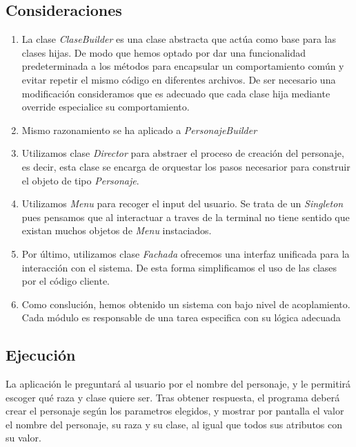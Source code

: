 \documentclass{article}
\begin{document}
\subsection{Consideraciones}
\begin{enumerate}[label=-] %
    \item La clase \textit{ClaseBuilder} es una clase abstracta que actúa como base para las clases hijas. De modo que hemos optado por dar una 
    funcionalidad predeterminada a los métodos para encapsular un comportamiento común y evitar repetir el mismo código en diferentes 
    archivos. De ser necesario una modificación consideramos que es adecuado que cada clase hija mediante override especialice su 
    comportamiento.

    \item Mismo razonamiento se ha aplicado a \textit{PersonajeBuilder}
    
    \item Utilizamos clase \textit{Director} para abstraer el proceso de creación del personaje, es decir, esta clase se encarga de orquestar los pasos necesarior para construir el objeto de tipo \textit{Personaje}.

    \item Utilizamos \textit{Menu} para recoger el input del usuario. Se trata de un \textit{Singleton} pues pensamos que al interactuar a traves de la terminal no tiene sentido que existan muchos objetos de \textit{Menu} instaciados.

    \item Por último, utilizamos clase \textit{Fachada} ofrecemos una interfaz unificada para la interacción con el sistema. De esta forma simplificamos el uso de las clases por el código cliente.

    \item  Como conslución, hemos obtenido un sistema con bajo nivel de acoplamiento. Cada módulo es responsable de una tarea especifica con su lógica adecuada
\end{enumerate}


\newpage
\subsection{Ejecución}
La aplicación le preguntará al usuario por el nombre del personaje, y le permitirá escoger qué raza y clase quiere ser.
Tras obtener respuesta, el programa deberá crear el personaje según los parametros elegidos, y mostrar por pantalla el valor
el nombre del personaje, su raza y su clase, al igual que todos sus atributos con su valor.
\end{document}
